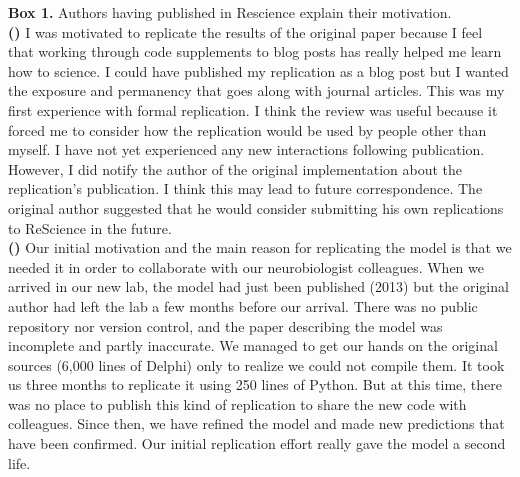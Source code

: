 \documentclass[a4paper,10pt, twocolumn]{article}
\begin{document}
\begin{tcolorbox}[breakable, pad at break*=1mm,
                  colback=black!2.5, arc=0pt, outer arc=0pt, boxrule=.25pt]
\begin{footnotesize}
\textbf{Box 1.} Authors having  published in Rescience explain their motivation.\\

\textbf{(\cite{stachelek:2016})} I was motivated to replicate the results of
the original paper because I feel that working through code supplements to blog
posts has really helped me learn how to science. I could have published my
replication as a blog post but I wanted the exposure and permanency that goes
along with journal articles. This was my first experience with formal
replication. I think the review was useful because it forced me to consider how
the replication would be used by people other than myself. I have not yet
experienced any new interactions following publication. However, I did notify
the author of the original implementation about the replication's
publication. I think this may lead to future correspondence. The original
author suggested that he would consider submitting his own replications to
ReScience in the future.\\

\textbf{(\cite{topalidou:2015b})} Our initial motivation and the main reason
for replicating the model is that we needed it in order to collaborate with our
neurobiologist colleagues. When we arrived in our new lab, the model had just
been published (2013) but the original author had left the lab a few months before
our arrival. There was no public repository nor version control, and the paper
describing the model was incomplete and partly inaccurate. We managed to get
our hands on the original sources (6,000 lines of Delphi) only to realize we
could not compile them. It took us three months to replicate it using 250 lines
of Python. But at this time, there was no place to publish this kind of
replication to share the new code with colleagues. Since then, we have refined
the model and made new predictions that have been confirmed. Our initial
replication effort really gave the model a second life.\\


\end{footnotesize}
\end{tcolorbox}
\end{document}
